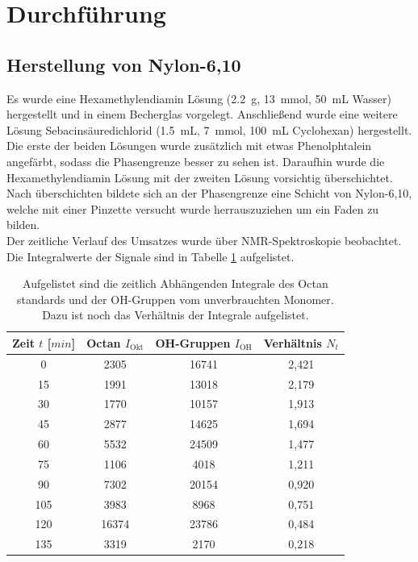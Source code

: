\documentclass[10pt,a4paper,ngerman]{scrartcl}
\begin{document}
\section{Durchführung}

	\subsection{Herstellung von Nylon-6,10}

		Es wurde eine Hexamethylendiamin Lösung (\SI{2,2}{g}, \SI{13}{mmol}, \SI{50}{mL} Wasser) hergestellt und in einem Becherglas vorgelegt.
		Anschließend wurde eine weitere Lösung Sebacinsäuredichlorid (\SI{1,5}{mL}, \SI{7}{mmol}, \SI{100}{mL} Cyclohexan) hergestellt.
		Die erste der beiden Lösungen wurde zusätzlich mit etwas Phenolphtalein angefärbt, sodass die Phasengrenze besser zu sehen ist.
		Daraufhin wurde die Hexamethylendiamin Lösung mit der zweiten Lösung vorsichtig überschichtet. 
		Nach überschichten bildete sich an der Phasengrenze eine Schicht von Nylon-6,10, welche mit einer Pinzette versucht wurde herrauszuziehen um ein Faden zu bilden.\\

		Der zeitliche Verlauf des Umsatzes wurde über NMR-Spektroskopie beobachtet. Die Integralwerte der Signale sind in Tabelle \ref{integraleOctOH} aufgelistet.

		\begin{table}[H]
    	\begin{center}
        	\caption{Aufgelistet sind die zeitlich Abhängenden Integrale des Octan standards und der OH-Gruppen vom unverbrauchten Monomer. Dazu ist noch das Verhältnis der Integrale aufgelistet.}
        	\label{integraleOctOH}
            	\begin{tabular}{c|c|c|c}
					\hline
					Zeit $t$ [$min$]& Octan $I_\text{Okt}$ & OH-Gruppen $I_\text{OH}$ & Verhältnis $N_t$\\
					\hline  
					0	&2305	&16741	&2,421 \\
					15	&1991	&13018	&2,179 \\
					30	&1770	&10157	&1,913\\
					45	&2877	&14625	&1,694\\
					60	&5532	&24509	&1,477\\
					75	&1106	&4018	&1,211\\
					90	&7302	&20154	&0,920\\
					105	&3983	&8968	&0,751\\
					120	&16374	&23786	&0,484\\
					135	&3319	&2170	&0,218\\
				\end{tabular}
		\end{center}
		\end{table}
\end{document}
